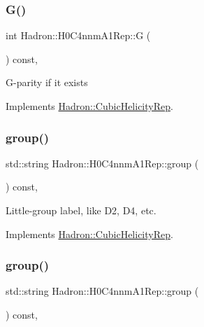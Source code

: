\subsubsection{\texorpdfstring{G()}{G()}\hspace{0.1cm}{\footnotesize\ttfamily [3/3]}}
{\footnotesize\ttfamily int Hadron\+::\+H0\+C4nnm\+A1\+Rep\+::G (\begin{DoxyParamCaption}{ }\end{DoxyParamCaption}) const\hspace{0.3cm}{\ttfamily [inline]}, {\ttfamily [virtual]}}

G-\/parity if it exists 

Implements \mbox{\hyperlink{structHadron_1_1CubicHelicityRep_a50689f42be1e6170aa8cf6ad0597018b}{Hadron\+::\+Cubic\+Helicity\+Rep}}.

\mbox{\label{structHadron_1_1H0C4nnmA1Rep_a285f5eda1399e94ac66264af1a41c08a}} 
\subsubsection{\texorpdfstring{group()}{group()}\hspace{0.1cm}{\footnotesize\ttfamily [1/5]}}
{\footnotesize\ttfamily std\+::string Hadron\+::\+H0\+C4nnm\+A1\+Rep\+::group (\begin{DoxyParamCaption}{ }\end{DoxyParamCaption}) const\hspace{0.3cm}{\ttfamily [inline]}, {\ttfamily [virtual]}}

Little-\/group label, like D2, D4, etc. 

Implements \mbox{\hyperlink{structHadron_1_1CubicHelicityRep_a101a7d76cd8ccdad0f272db44b766113}{Hadron\+::\+Cubic\+Helicity\+Rep}}.

\mbox{\label{structHadron_1_1H0C4nnmA1Rep_a285f5eda1399e94ac66264af1a41c08a}} 
\subsubsection{\texorpdfstring{group()}{group()}\hspace{0.1cm}{\footnotesize\ttfamily [2/5]}}
{\footnotesize\ttfamily std\+::string Hadron\+::\+H0\+C4nnm\+A1\+Rep\+::group (\begin{DoxyParamCaption}{ }\end{DoxyParamCaption}) const\hspace{0.3cm}{\ttfamily [inline]}, {\ttfamily [virtual]}}

